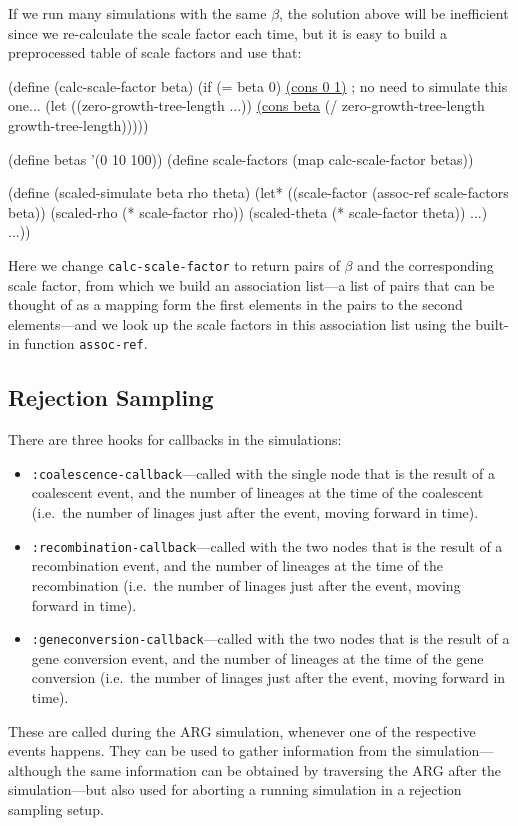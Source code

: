 \documentclass{manual}
\begin{document}
If we run many simulations with the same $\beta$, the solution above
will be inefficient since we re-calculate the scale factor each time,
but it is easy to build a preprocessed table of scale factors and use
that:
\begin{code}
(define (calc-scale-factor beta)
  (if (= beta 0) \underline{(cons 0 1)} ; no need to simulate this one...
      (let ((zero-growth-tree-length
              ...))
        \underline{(cons beta} (/ zero-growth-tree-length growth-tree-length)))))

(define betas '(0 10 100))
(define scale-factors (map calc-scale-factor betas))

(define (scaled-simulate beta rho theta)
  (let* ((scale-factor   (assoc-ref scale-factors beta))
         (scaled-rho     (* scale-factor rho))
         (scaled-theta   (* scale-factor theta))
         ...)
    ...))
\end{code}
Here we change \texttt{calc-scale-factor} to return pairs of $\beta$
and the corresponding scale factor, from which we build an association
list---a list of pairs that can be thought of as a mapping form the
first elements in the pairs to the second elements---and we look up
the scale factors in this association list using the built-in function
\texttt{assoc-ref}.
  

\subsection{Rejection Sampling}
\label{sec:rejection-sampling}

There are three hooks for callbacks in the simulations:
\begin{itemize}
\item \texttt{:coalescence-callback}---called with the single node
  that is the result of a coalescent event, and the number of lineages
  at the time of the coalescent (i.e.\ the number of linages just after
  the event, moving forward in time).
\item \texttt{:recombination-callback}---called with the two nodes
  that is the result of a recombination event, and the number of
  lineages at the time of the recombination (i.e.\ the number of
  linages just after the event, moving forward in time).
\item \texttt{:geneconversion-callback}---called with the two nodes
  that is the result of a gene conversion event, and the number of
  lineages at the time of the gene conversion (i.e.\ the number of
  linages just after the event, moving forward in time).
\end{itemize}
These are called during the ARG simulation, whenever one of the
respective events happens.  They can be used to gather information
from the simulation---although the same information can be obtained by
traversing the ARG after the simulation---but also used for aborting a
running simulation in a rejection sampling setup.
\end{document}
